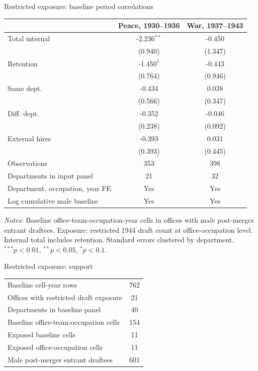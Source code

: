 \begin{frame}[t]{Restricted exposure: baseline period correlations}
\hypertarget{app:restricted-entrant-baseline-period}{}
\scriptsize\centering
\begin{threeparttable}
\begin{tabular}{lcc}
\toprule
 & Peace, 1930--1936 & War, 1937--1943 \\
\midrule
Total internal & -2.236$^{**}$ & -0.450 \\
 & (0.940) & (1.347) \\
Retention & -1.450$^{*}$ & -0.443 \\
 & (0.764) & (0.946) \\
Same dept. & -0.434 & 0.038 \\
 & (0.566) & (0.347) \\
Diff. dept. & -0.352 & -0.046 \\
 & (0.238) & (0.092) \\
External hires & -0.393 & 0.031 \\
 & (0.393) & (0.445) \\
\midrule
Observations & 353 & 398 \\
Departments in input panel & 21 & 32 \\
Department, occupation, year FE & Yes & Yes \\
Log cumulative male baseline & Yes & Yes \\
\bottomrule
\end{tabular}
\begin{tablenotes}[flushleft]\tiny
\item \textit{Notes:} Baseline office-team-occupation-year cells in offices with male post-merger entrant draftees. Exposure: restricted 1944 draft count at office-occupation level. Internal total includes retention. Standard errors clustered by department. $^{***}p<0.01$, $^{**}p<0.05$, $^{*}p<0.1$.
\end{tablenotes}\end{threeparttable}\end{frame}

\begin{frame}[t]{Restricted exposure: support}
\hypertarget{app:restricted-entrant-support}{}
\scriptsize\centering\begin{tabular}{lc}\toprule
Baseline cell-year rows & 762 \\
Offices with restricted draft exposure & 21 \\
Departments in baseline panel & 40 \\
Baseline office-team-occupation cells & 154 \\
Exposed baseline cells & 11 \\
Exposed office-occupation cells & 11 \\
Male post-merger entrant draftees & 601 \\
\bottomrule\end{tabular}\end{frame}
